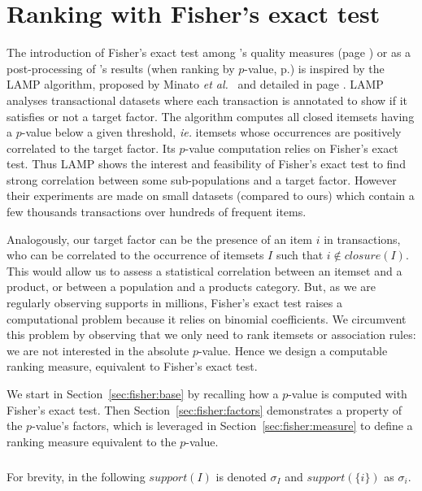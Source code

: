 \chapter{Ranking with Fisher's exact test}
\label{chap:fisher}



The introduction of Fisher's exact test
among \capa's quality measures (page \pageref{tab:measures})
or as a post-processing of \toppi's results
(when ranking by $p$-value, p.\pageref{sec:quali:pval})
is inspired by the LAMP algorithm, proposed by Minato \textit{et al.}~\cite{MinatoKDD14}
and detailed in page \pageref{sec:rel:lamp}.
LAMP analyses transactional datasets where each transaction is annotated to
show if it satisfies or not a target factor.
The algorithm computes all closed itemsets having a $p$-value below a given threshold,
{\em ie.} itemsets whose occurrences are positively correlated to the target factor.
Its $p$-value computation relies on Fisher's exact test.
Thus LAMP shows the interest and feasibility of Fisher's exact test to find
strong correlation between some sub-populations and a target factor.
However their experiments are made on small datasets (compared to ours)
which contain a few thousands transactions over hundreds of frequent items.

Analogously, our target factor can be the presence of an item $i$ in transactions,
who can be correlated to the occurrence of itemsets $I$ such that $i \notin \mathit{closure}(I)$.
This would allow us to assess a statistical correlation between an itemset and a product,
or between a population and a products category.
But, as we are regularly observing supports in millions,
Fisher's exact test raises a computational problem
because it relies on binomial coefficients.
We circumvent this problem by observing that we only need to rank itemsets or association rules:
we are not interested in the absolute $p$-value.
Hence we design a computable ranking measure, equivalent to Fisher's exact test.

We start in Section~\ref{sec:fisher:base} by recalling how a $p$-value is computed with Fisher's exact test.
Then Section~\ref{sec:fisher:factors} demonstrates a property of the $p$-value's factors,
which is leveraged in Section~\ref{sec:fisher:measure} to define a ranking measure
equivalent to the $p$-value.

\paragraph{}{
  For brevity, in the following $\mathit{support}(I)$ is denoted $\sigma_I$
  and $\mathit{support}(\{i\})$ as $\sigma_i$.
}

